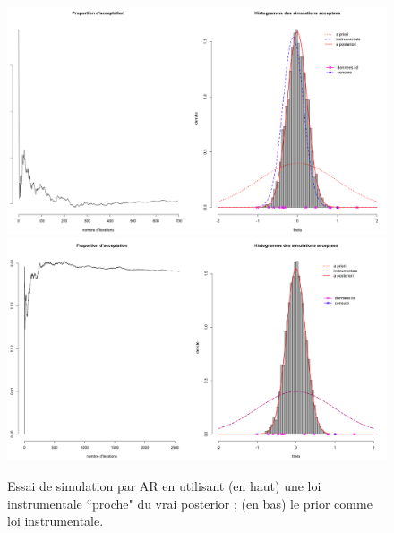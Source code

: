\begin{figure}[hbtp]
\begin{center}
\includegraphics[scale=0.3]{figures/calcul/AR1.png} \\
\includegraphics[scale=0.3]{figures/calcul/AR2.png}
\caption{
Essai de simulation par AR en utilisant (en haut) une loi instrumentale ``proche" du vrai posterior ; (en bas) le prior comme loi instrumentale.}
\label{ARillus}
\end{center}
\end{figure}
